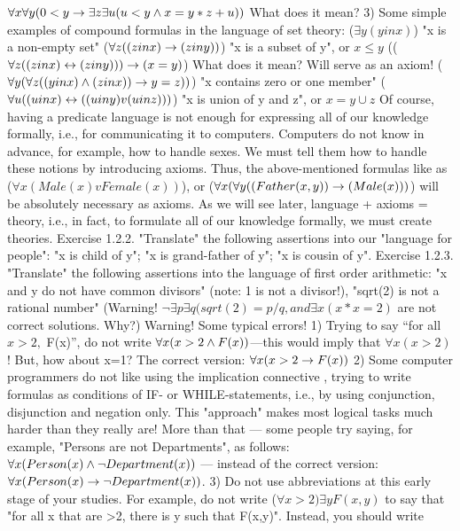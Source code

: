 \(\forall x\forall y(0<y \rightarrow  \exists z\exists u(u<y \wedge  x=y*z+u))\) What does it mean?
3) Some simple examples of compound formulas in the language of set theory:
(\(\exists y(y in x)\)) "x is a non-empty set"
(\(\forall z((z in x)\rightarrow (z in y))\)) "x is a subset of y", or \(x\leq y\)
((\(\forall z((z in x)\leftrightarrow ( z in y)))\rightarrow ( x=y)\)) What does it mean? Will serve as an axiom!
(\(\forall y(\forall z((y in x) \wedge  (z in x))\rightarrow y=z))\)) "x contains zero or one member"
(\(\forall u((u in x)\leftrightarrow ( (u in y) v (u in z)))\)) "x is union of y and z", or \(x=y\cup z\)
Of course, having a predicate language is not enough for expressing all of our knowledge formally, i.e.,
for communicating it to computers. Computers do not know in advance, for example, how to handle
sexes. We must tell them how to handle these notions by introducing axioms. Thus, the above-mentioned
formulas like as (\(\forall x(Male(x) v Female(x))\)), or (\(\forall x(\forall y((Father(x, y))\rightarrow (Male(x)))\)) will be absolutely
necessary as axioms. As we will see later, language + axioms = theory, i.e., in fact, to formulate all of our
knowledge formally, we must create theories.
Exercise 1.2.2. "Translate" the following assertions into our "language for people":
"x is child of y";
"x is grand-father of y";
"x is cousin of y".
Exercise 1.2.3. "Translate" the following assertions into the language of first order arithmetic:
"x and y do not have common divisors" (note: 1 is not a divisor!),
"sqrt(2) is not a rational number"
(Warning! \(\neg \exists p\exists q(sqrt(2)=p/q, and \exists x(x*x=2)\) are not correct solutions. Why?)
Warning! Some typical errors!
1) Trying to say ``for all \(x>2,\) F(x)'', do not write \(\forall x(x>2\wedge F(x))\)---this would imply that \(\forall x(x>2)\)! But,
how about x=1? The correct version: \(\forall x(x>2\rightarrow F(x))\)
2) Some computer programmers do not like using the implication connective \IMPLIES , trying to write formulas
as conditions of IF- or WHILE-statements, i.e., by using conjunction, disjunction and negation only. This
"approach" makes most logical tasks much harder than they really are! More than that --- some people try
saying, for example, "Persons are not Departments", as follows:
\(\forall x(Person(x)\wedge \neg Department(x))\) --- instead of the correct version: \(\forall x(Person(x)\rightarrow \neg Department(x))\).
3) Do not use abbreviations at this early stage of your studies. For example, do not write (\(\forall x>2)\exists yF(x,y)\)
to say that "for all x that are >2, there is y such that F(x,y)". Instead, you should write
